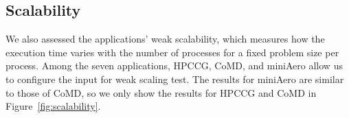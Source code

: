 \subsection{Scalability}

We also assessed the applications' weak scalability, which measures how the execution time varies with the number of processes for a fixed problem size per process.
Among the seven applications, HPCCG, CoMD, and miniAero allow us to configure the input for weak scaling test. The results for miniAero are similar to those of CoMD, so we only show the results for HPCCG and CoMD in Figure~\ref{fig:scalability}. %


